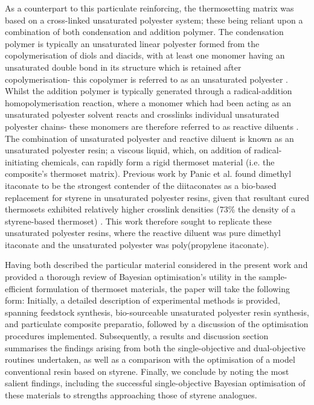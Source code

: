 As a counterpart to this particulate reinforcing, the
 thermosetting matrix was based on a cross-linked unsaturated
 polyester system; these being reliant upon a combination of
 both condensation and addition polymer.
The condensation polymer is typically an unsaturated linear polyester
 formed from the copolymerisation of diols and diacids, with at least one
 monomer having an unsaturated double bond in its structure which is
 retained after copolymerisation- this copolymer is referred to as an
 unsaturated polyester \autocite{Seraji2022}.
Whilst the addition polymer is typically generated through a radical-addition
 homopolymerisation reaction, where a monomer which had been acting as
 an unsaturated polyester solvent reacts and crosslinks individual 
 unsaturated polyester chains- these monomers are therefore referred to as
 reactive diluents \autocite{Chen2015}.
The combination of unsaturated polyester and reactive diluent is known
 as an unsaturated polyester resin; a viscous liquid, which, on addition
 of radical-initiating chemicals, can rapidly form a rigid thermoset
 material (i.e. the composite's thermoset matrix).
Previous work by Panic et al. found dimethyl itaconate to be the strongest
 contender of the diitaconates as a bio-based replacement for styrene
 in unsaturated polyester resins, given that resultant cured thermosets
 exhibited relatively higher crosslink densities (73\unit{\percent} the
 density of a styrene-based thermoset) \autocite{Panic2017}.
This work therefore sought to replicate these unsaturated polyester resins,
 where the reactive diluent was pure dimethyl itaconate and the unsaturated
 polyester was poly(propylene itaconate).

Having both described the particular material considered in the present
 work and provided a thorough review of Bayesian optimisation's utility
 in the sample-efficient formulation of thermoset materials, the paper
 will take the following form:
Initially, a detailed description of experimental methods is
 provided, spanning feedstock synthesis, bio-sourceable unsaturated
 polyester resin synthesis, and particulate composite preparatio, followed
 by a discussion of the optimisation procedures implemented.
Subsequently, a results and discussion section summarises the findings
 arising from both the single-objective and dual-objective routines
 undertaken, as well as a comparison with the optimisation of a 
 model conventional resin based on styrene.
Finally, we conclude by noting the most salient findings, including
 the successful single-objective Bayesian optimisation of
 these materials to strengths approaching those of styrene analogues.
